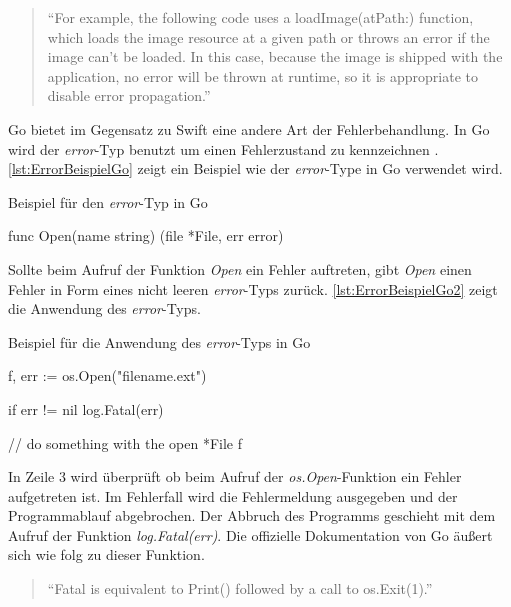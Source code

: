 \begin{quote}
\enquote{For example, the following code uses a  loadImage(atPath:) function, which loads the image
resource at a given path or throws an error if the image can’t be loaded. In this case, because the
image is shipped with the application, no error will be thrown at runtime, so it is appropriate to
disable error propagation.} \cite[S.317]{Apple.2017}
\end{quote}

Go bietet im Gegensatz zu Swift eine andere Art der Fehlerbehandlung.
In Go wird der \textit{error}-Typ benutzt um einen Fehlerzustand zu kennzeichnen \cite[]{GoBlog.ErroHandling}.
\autoref{lst:ErrorBeispielGo} zeigt ein Beispiel wie der \textit{error}-Type in Go verwendet wird.

\begin{listing}[H]
\caption{Beispiel für den \textit{error}-Typ in Go \cite[]{GoBlog.ErroHandling}}
\label{lst:ErrorBeispielGo}
\begin{GoCode}
func Open(name string) (file *File, err error)
\end{GoCode}
\end{listing}

Sollte beim Aufruf der Funktion \textit{Open} ein Fehler auftreten, gibt \textit{Open} einen Fehler in Form eines nicht leeren \textit{error}-Typs zurück.
\autoref{lst:ErrorBeispielGo2} zeigt die Anwendung des \textit{error}-Typs.

\begin{listing}[H]
\caption{Beispiel für die Anwendung des \textit{error}-Typs in Go \cite[]{GoBlog.ErroHandling}}
\label{lst:ErrorBeispielGo2}
\begin{GoCode}
f, err := os.Open("filename.ext")

if err != nil {
    log.Fatal(err)
}

// do something with the open *File f
\end{GoCode}
\end{listing}

In Zeile 3 wird überprüft ob beim Aufruf der \textit{os.Open}-Funktion ein Fehler aufgetreten ist. 
Im Fehlerfall wird die Fehlermeldung ausgegeben und der Programmablauf abgebrochen.
Der Abbruch des Programms geschieht mit dem Aufruf der Funktion \textit{log.Fatal(err)}.
Die offizielle Dokumentation von Go äußert sich wie folg zu dieser Funktion.

\begin{quote}
\enquote{Fatal is equivalent to Print() followed by a call to os.Exit(1).} \cite[]{GoDoc.Log}
\end{quote}

